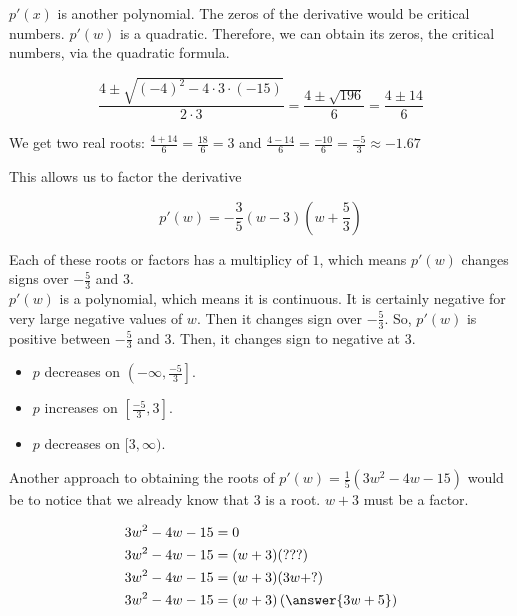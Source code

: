 \documentclass{ximera}
\begin{document}
$p'(x)$ is another polynomial. The zeros of the derivative would be critical numbers.  $p'(w)$ is a quadratic.  Therefore, we can obtain its zeros, the critical numbers, via the quadratic formula.


\[  \frac{4 \pm \sqrt{(-4)^2 - 4 \cdot 3 \cdot (-15)}}{2 \cdot 3} =    \frac{4 \pm \sqrt{196}}{6}  = \frac{4 \pm 14}{6}       \]

We get two real roots: $\frac{4 + 14}{6} = \frac{18}{6} = 3$  and $\frac{4 - 14}{6} = \frac{-10}{6} = \frac{-5}{3} \approx -1.67$




This allows us to factor the derivative

\[
p'(w) = -\frac{3}{5}(w - 3) \left( w + \frac{5}{3} \right)
\]

Each of these roots or factors has a multiplicy of $1$, which means $p'(w)$ changes signs over $-\frac{5}{3}$ and $3$. \\


$p'(w)$ is a polynomial, which means it is continuous. It is certainly negative for very large negative values of $w$.  Then it changes sign over $-\frac{5}{3}$.  So, $p'(w)$ is positive between $-\frac{5}{3}$ and $3$.  Then, it changes sign to negative at $3$.





\begin{itemize}
\item $p$ decreases on $\left(-\infty, \frac{-5}{3}\right]$.
\item $p$ increases on $\left[\frac{-5}{3}, 3\right]$.
\item $p$ decreases on $[3, \infty)$.
\end{itemize}



Another approach to obtaining the roots of $p'(w) = \frac{1}{5}(3w^2 - 4w - 15)$ would be to notice that we already know that $3$ is a root. $w+3$ must be a factor.



\begin{align*}
3w^2 - 4w - 15     & = 0        \\
3w^2 - 4w - 15     & = (w+3) (???)        \\
3w^2 - 4w - 15     & = (w+3) (3w + ?)        \\
3w^2 - 4w - 15     & = (w+3) \left( \answer{3w + 5} \right)        
\end{align*}
\end{document}
